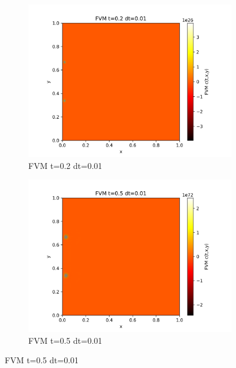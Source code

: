 \documentclass[11pt,a4 paper,one side]{article}
\begin{document}
\begin{figure}[htbp]
    \begin{subfigure}{0.45\textwidth}
        \includegraphics[width=\textwidth]{FVM t=0.2 dt=0.01.png}
        \caption{FVM t=0.2 dt=0.01}
        \label{FVM t=0.2 dt=0.01}
    \end{subfigure}
    \hfill
    \begin{subfigure}{0.45\textwidth}
        \includegraphics[width=\textwidth]{FVM t=0.5 dt=0.01.png}
        \caption{FVM t=0.5 dt=0.01}
        \label{FVM t=0.5 dt=0.01}
    \end{subfigure}
    
    \vspace{0.1cm}  %
    

\end{figure}
\end{document}
